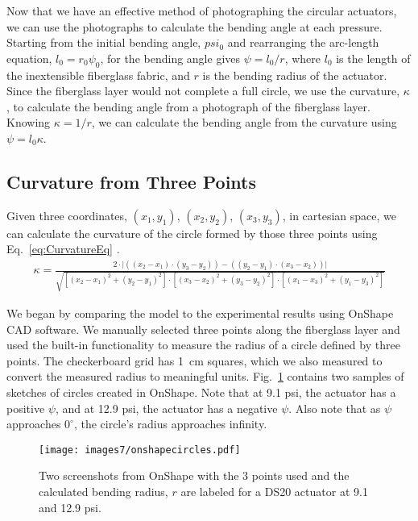 Now that we have an effective method of photographing the circular actuators, we can use the photographs to calculate the bending angle at each pressure. Starting from the initial bending angle, $psi_0$ and rearranging the arc-length equation, $l_{0} = r_{0}\psi_{0}$, for the bending angle gives $\psi = l_0/r$, where $l_0$ is the length of the inextensible fiberglass fabric, and $r$ is the bending radius of the actuator. Since the fiberglass layer would not complete a full circle, we use the curvature, $\kappa$, to calculate the bending angle from a photograph of the fiberglass layer. Knowing $\kappa = 1/r$, we can calculate the bending angle from the curvature using $\psi = l_{0}\kappa$. 

\subsection{Curvature from Three Points}

Given three coordinates, $(x_1,y_1)$, $(x_2,y_2)$, $(x_3,y_3)$, in cartesian space, we can calculate the curvature of the circle formed by those three points using Eq.~\ref{eq:CurvatureEq} \cite{ratliff_cartesian_2019}. 
\begin{align} 
    \kappa = \frac{2\cdot\lvert((x_2-x_1)\cdot(y_3-y_2)) - ((y_2-y_1)\cdot(x_3-x_2))\rvert}{\sqrt{[(x_2-x_1)^2+(y_2-y_1)^2] \cdot [(x_3-x_2)^2+(y_3-y_2)^2] \cdot [(x_1-x_3)^2+(y_1-y_3)^2]}} 
    \label{eq:CurvatureEq} 
\end{align}

We began by comparing the model to the experimental results using OnShape CAD software. We manually selected three points along the fiberglass layer and used the built-in functionality to measure the radius of a circle defined by three points. The checkerboard grid has 1~cm squares, which we also measured to convert the measured radius to meaningful units. Fig.~\ref{fig:onshapecircles} contains two samples of sketches of circles created in OnShape. Note that at 9.1 psi, the actuator has a positive $\psi$, and at 12.9 psi, the actuator has a negative $\psi$. Also note that as $\psi$ approaches $0^\circ$, the circle's radius approaches infinity. 

\begin{figure}[ht]
    \centering
     \texttt{[image: images7/onshapecircles.pdf]}
    \caption{Two screenshots from OnShape with the 3 points used and the calculated bending radius, $r$ are labeled for a DS20 actuator at 9.1 and 12.9 psi.}
    \label{fig:onshapecircles}
\end{figure}


